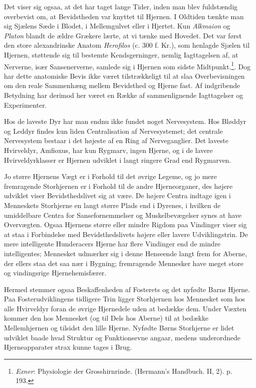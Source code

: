 \documentclass[12pt,a4paper,openany]{book}
\newcommand{\opage}[1]{\marginnote{\footnotesize\textit{[#1]}}}
\begin{document}
Det viser sig ogsaa, at det har taget lange Tider, inden man blev
fuldstændig overbevist om, at Bevidstheden var knyttet til Hjernen. I
Oldtiden tænkte man sig Sjælens Sæde i Blodet, i Mellemgulvet eller i
Hjertet. Kun \emph{Alkmaion} og \emph{Platon} blandt de ældre Grækere
lærte, at vi tænke med Hovedet. Det var først den store alexandrinske
Anatom \emph{Herofilos}
\opage{65}(c. 300 f. Kr.), som henlagde Sjælen til Hjernen, støttende
sig til bestemte Kendsgerninger, nemlig Iagttagelsen af, at Nerverne,
især Sansenerverne, samlede sig i Hjernen som sidste
Midtpunkt.\footnote[1]{\emph{Exner}: Physiologie der Grosshirnrinde.
(Hermann’s Handbuch. II, 2). p. 193.}. Dog har dette anatomiske Bevis
ikke været tilstrækkeligt til at slaa Overbevisningen om den reale
Sammenhæng mellem Bevidsthed og Hjerne fast. Af indgribende Betydning
har derimod her været en Række af sammenlignende Iagttagelser og
Experimenter.

Hos de laveste Dyr har man endnu ikke fundet noget Nervesystem. Hos
Bløddyr og Leddyr findes kun liden Centralisation af Nervesystemet; det
centrale Nervesystem bestaar i det højeste af en Ring af Nerveganglier.
Det laveste Hvirveldyr, Amfioxus, har kun Rygmarv, ingen Hjerne, og i de
lavere Hvirveldyrklasser er Hjernen udviklet i langt ringere Grad end
Rygmarven.

Jo større Hjernens Vægt er i Forhold til det øvrige Legeme, og jo mere
fremragende Storhjernen er i Forhold til de andre Hjerneorganer, des
højere udviklet viser Bevidsthedslivet sig at være. De højere Centra
indtage igen i Menneskets Storhjerne en langt større Plads end i
Dyrenes, i hvilken de umiddelbare Centra for Sansefornemmelser og
Muskelbevægelser synes at have Overvægten. Ogsaa Hjernens større eller
mindre Rigdom paa Vindinger viser sig at staa i Forbindelse med
Bevidsthedslivets højere eller lavere Udviklingstrin. De mere
intelligente Hunderacers Hjerne har flere Vindinger end de mindre
intelligentes; Mennesket udmærker sig i denne Henseende langt frem for
Aberne, der ellers staa det saa nær i Bygning; fremragende Mennesker
have meget store og vindingsrige Hjernehemisfærer.

Hermed stemmer ogsaa Beskaffenheden af Fosterets og det nyfødte Barns
Hjerne. Paa Fosterudviklingens tidligere Trin ligger Storhjernen hos
Mennesket som hos alle Hvirveldyr foran de øvrige Hjernedele uden at
bedække dem. Under Væxten kommer den hos Mennesket (og til Dels hos
Aberne) til at bedække Mellemhjernen og tilsidst den lille Hjerne.
Nyfødte Børns Storhjerne er lidet udviklet baade hvad Struktur og
\opage{66}Funktionsevne angaar, medens underordnede Hjerneapparater
strax kunne tages i Brug.
\end{document}
